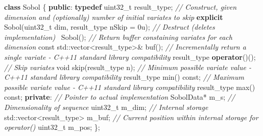 \documentclass{JASSS}
\newenvironment{Shaded}{\begin{snugshade}}{\end{snugshade}}
\newcommand{\KeywordTok}[1]{\textcolor[rgb]{0.13,0.29,0.53}{\textbf{{#1}}}}
\newcommand{\DataTypeTok}[1]{\textcolor[rgb]{0.13,0.29,0.53}{{#1}}}
\newcommand{\DecValTok}[1]{\textcolor[rgb]{0.00,0.00,0.81}{{#1}}}
\newcommand{\CommentTok}[1]{\textcolor[rgb]{0.56,0.35,0.01}{\textit{{#1}}}}
\newcommand{\NormalTok}[1]{{#1}}
\begin{document}
\begin{Shaded}
\begin{Highlighting}[]
  \KeywordTok{class} \NormalTok{Sobol}
  \NormalTok{\{}
  \KeywordTok{public}\NormalTok{:}
    \KeywordTok{typedef} \DataTypeTok{uint32_t} \NormalTok{result_type;}
    \CommentTok{// Construct, given dimension and (optionally) number of initial variates to skip}    
    \KeywordTok{explicit} \NormalTok{Sobol(}\DataTypeTok{uint32_t} \NormalTok{dim, result_type nSkip = }\DecValTok{0u}\NormalTok{);}
    \CommentTok{// Destruct (deletes implementation)}
    \NormalTok{~Sobol();}
    \CommentTok{// Return buffer constaining variates for each dimension}
    \DataTypeTok{const} \NormalTok{std::vector<result_type>& buf();}
    \CommentTok{// Incrementally return a single variate - C++11 standard library compatibility}
    \NormalTok{result_type }\KeywordTok{operator}\NormalTok{()();}
    \CommentTok{// Skip variates}    
    \DataTypeTok{void} \NormalTok{skip(result_type n);}
    \CommentTok{// Minimum possible variate value - C++11 standard library compatibility}
    \NormalTok{result_type min() }\DataTypeTok{const}\NormalTok{;}
    \CommentTok{// Maximum possible variate value - C++11 standard library compatibility}
    \NormalTok{result_type max() }\DataTypeTok{const}\NormalTok{;}
  \KeywordTok{private}\NormalTok{:}
    \CommentTok{// Pointer to actual implementation}    
    \NormalTok{SobolData* m_s;}
    \CommentTok{// Dimensionality of sequence}    
    \DataTypeTok{uint32_t} \NormalTok{m_dim;}
    \CommentTok{// Internal storage}        
    \NormalTok{std::vector<result_type> m_buf;} 
    \CommentTok{// Current position within internal storage for operator()}            
    \DataTypeTok{uint32_t} \NormalTok{m_pos;}
  \NormalTok{\};}


\end{Highlighting}
\end{Shaded}
\end{document}

